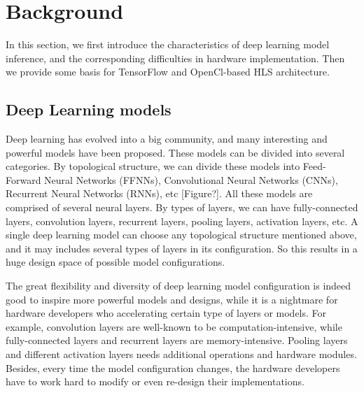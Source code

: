 \documentclass{acm_proc_article-sp-copy}
\begin{document}
\section{Background}
In this section, we first introduce the characteristics of deep learning model inference, and the corresponding difficulties in hardware implementation. Then we provide some basis for TensorFlow and OpenCl-based HLS architecture.

\subsection{Deep Learning models}
Deep learning has evolved into a big community, and many interesting and powerful models have been proposed. These models can be divided into several categories. By topological structure, we can divide these models into Feed-Forward Neural Networks (FFNNs), Convolutional Neural Networks (CNNs), Recurrent Neural Networks (RNNs), etc [Figure?]. All these models are comprised of several neural layers. By types of layers, we can have fully-connected layers, convolution layers, recurrent layers, pooling layers, activation layers, etc. A single deep learning model can choose any topological structure mentioned above, and it may includes several types of layers in its configuration. So this results in a huge design space of possible model configurations.

The great flexibility and diversity of deep learning model configuration is indeed good to inspire more powerful models and designs, while it is a nightmare for hardware developers who accelerating certain type of layers or models. For example, convolution layers are well-known to be computation-intensive, while fully-connected layers and recurrent layers are memory-intensive. Pooling layers and different activation layers needs additional operations and hardware modules. Besides, every time the model configuration changes, the hardware developers have to work hard to modify or even re-design their implementations. 
\end{document}
